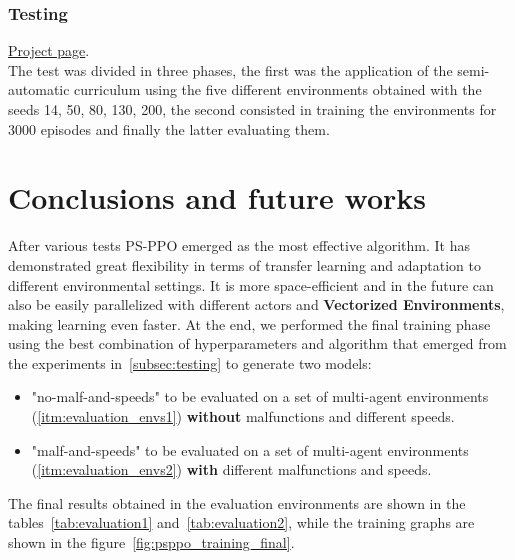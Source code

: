 \documentclass[11pt, a4paper, hidelinks]{report}
\begin{document}
\subsection{Testing}\label{subsec:testing3}
\href{https://app.wandb.ai/lomb/flatland-challenge-ps-ppo-curriculum?workspace=user-lomb}{Project page}.\\

The test was divided in three phases, the first was the application of the semi-automatic curriculum using the five different environments obtained with the seeds 14, 50, 80, 130, 200, the second consisted in training the environments for 3000 episodes and finally the latter evaluating them.

\chapter{Conclusions and future works}\label{ch:conclusions-and-future-works}

After various tests PS-PPO emerged as the most effective algorithm.
It has demonstrated great flexibility in terms of transfer learning and adaptation to different environmental settings.
It is more space-efficient and in the future can also be easily parallelized with different actors and \textbf{Vectorized Environments}, making learning even faster.
At the end, we performed the final training phase using the best combination of hyperparameters and algorithm that emerged from the experiments in~\ref{subsec:testing} to generate two models:
\begin{itemize}
\item "no-malf-and-speeds" to be evaluated on a set of multi-agent environments (\ref{itm:evaluation_envs1}) \textbf{without} malfunctions and different speeds.
\item "malf-and-speeds" to be evaluated on a set of multi-agent environments (\ref{itm:evaluation_envs2}) \textbf{with} different malfunctions and speeds.
\end{itemize}

The final results obtained in the evaluation environments are shown in the tables~\ref{tab:evaluation1} and~\ref{tab:evaluation2}, while the training graphs are shown in the figure~\ref{fig:psppo_training_final}.
\end{document}
